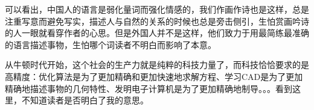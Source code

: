 \documentclass[UTF8,oneside]{ctexbook}
\begin{document}
\begin{table}[!htb]
	\renewcommand{\arraystretch}{1.3} %
	\caption{中英对比}\label{tab:compareCandE}
	\centering
	\vspace{0.2cm}
\end{table}

可以看出，中国人的语言是弱化量词而强化情感的，我们作画作诗也是这样，总是注重写意而避免写实，描述人与自然的关系的时候也总是旁击侧引，生怕赏画吟诗的人一眼就看穿作者的心思。但是外国人并不是这样，他们致力于用最简练最准确的语言描述事物，生怕哪个词读者不明白而影响了本意。

从牛顿时代开始，这个社会的生产力就是纯粹的科技力量了，而科技恰恰要求的是高精度：优化算法是为了更加精确和更加快速地求解方程、学习CAD是为了更加精确地描述事物的几何特性、发明电子计算机是为了更加精确地制导。。。看到这里，不知道读者是否明白了我的意思。
\end{document}
